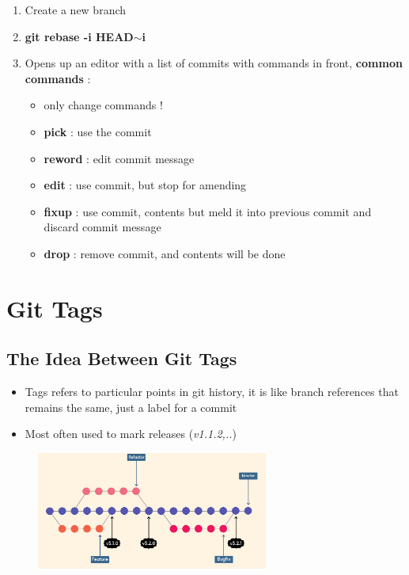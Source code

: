 \documentclass{report}
\newcommand{\warning}{
	{\fontencoding{U}\fontfamily{futs}\selectfont\char 66\relax}
}
\begin{document}
\begin{enumerate}
	\item Create a new branch 
	\item \textbf{git rebase -i HEAD$\sim$i} 
	\item Opens up an editor with a list of commits with commands in front, \textbf{common commands} :
		\begin{itemize}
			\item \warning only change commands !
			\item \textbf{pick} : use the commit 
			\item \textbf{reword} : edit commit message 
			\item \textbf{edit} : use commit, but stop for amending 
			\item \textbf{fixup} : use commit, contents but meld it into previous commit and discard commit message 
			\item \textbf{drop} : remove commit, and contents will be done
		\end{itemize}
\end{enumerate}

\chapter{Git Tags}

\section{The Idea Between Git Tags}

\begin{itemize}
	\item Tags refers to particular points in git history, it is like branch references that remains the same, just a label for a commit 
	\item Most often used to mark releases (\textit{v1.1.2,..}) 
\end{itemize}

\begin{figure}[H] 
	 \centering 
	 \includegraphics[width=3in]{screenshots/2022-07-10T01-23-06Z.png} 
\end{figure}
\end{document}
